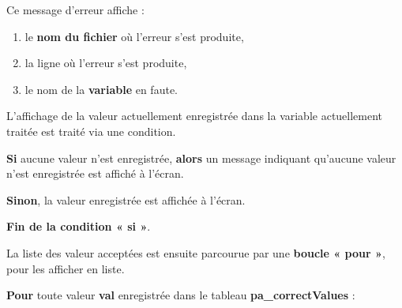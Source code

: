 \documentclass[a4paper,10pt]{article}
\begin{document}
    \setlength{\parskip}{1em}

    \begin{justify}
        Ce message d'erreur affiche :
        \begin{enumerate}
            \item le \textbf{\color{path}nom du fichier} où l'erreur s'est produite,
            \item la ligne où l'erreur s'est produite,
            \item le nom de la \textbf{\color{vars}variable} en faute.
        \end{enumerate}
    \end{justify}


    \setlength{\parskip}{2em}

    \begin{justify}
        L'affichage de la valeur actuellement enregistrée dans la variable actuellement traitée est traité via une condition.
    \end{justify}

    \setlength{\parskip}{1em}

    \begin{justify}
        \textbf{\color{cond}Si} aucune valeur n'est enregistrée, \textbf{\color{cond}alors} un message indiquant qu'aucune valeur n'est enregistrée est affiché à l'écran.
    \end{justify}

    \begin{justify}
        \textbf{\color{cond}Sinon}, la valeur enregistrée est affichée à l'écran.
    \end{justify}

    \begin{justify}
        \textbf{\color{cond} Fin de la condition « si »}.
    \end{justify}

    \setlength{\parskip}{2em}


    \begin{justify}
        La liste des valeur acceptées est ensuite parcourue par une \textbf{\color{loop}boucle « pour »}, pour les afficher en liste.
    \end{justify}

    \setlength{\parskip}{1em}

    \begin{justify}
        \textbf{\color{loop}Pour} toute valeur \textbf{\color{vars}val} enregistrée dans le tableau \textbf{\color{vars}pa\_correctValues} :
    \end{justify}
\end{document}
